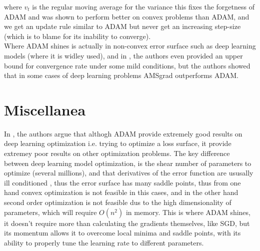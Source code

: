 \documentclass[10pt,a4paper]{article}
\begin{document}
where $v_t$ is the regular moving average for the variance
this fixes the forgetness of ADAM and was shown to perform better on convex problems than ADAM, and we get an update rule similar to ADAM but never get an increasing step-size (which is to blame for its inability to converge).\\
Where ADAM shines is actually in non-convex error surface such as deep learning models (where it is widley used), and in \cite{chen2018convergence}, the authors even provided an upper bound for convergence rate under some mild conditions, but the authors showed that in some cases of deep learning problems AMSgrad outperforms ADAM.\\



\section{Miscellanea}

In \cite{vaswani2019painless}, the authors argue that althogh ADAM provide extremely good results on deep learning optimization i.e. trying to optimize a loss surface, it provide extremey poor results on other optimization problems.
The key difference between deep learning model optimization, is the shear number of parameters to optimize (several millions), and that derivatives of the error function are ususally ill conditioned \cite{li2017visualizing}, thus the error surface has many saddle points, thus from one hand convex optimization is not feasible in this cases, and in the other hand second order optimization is not feasible dus to the high dimensionality of parameters, which will require $O(n^2)$ in memory. This is where ADAM shines, it doesn't require more than calculating the gradients themselves, like SGD, but its momentum allows it to overcome local minima and saddle points, with its ability to properly tune the learning rate to different parameters.




\end{document}
